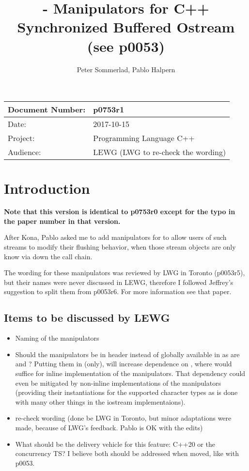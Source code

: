 \documentclass[ebook,11pt,article]{memoir}
\title{\papernumber{} - Manipulators for C++ Synchronized Buffered Ostream (see p0053)}
\author{Peter Sommerlad, Pablo Halpern}
\date{\paperdate}                %
\newcommand{\papernumber}{p0753r1}
\newcommand{\paperdate}{2017-10-15}
\begin{document}
\maketitle
\begin{center}
\begin{tabular}[t]{|l|l|}\hline 
Document Number:&  \papernumber \\\hline
Date: & \paperdate \\\hline
Project: & Programming Language C++\\\hline 
Audience: & LEWG (LWG to re-check the wording)\\\hline
\end{tabular}
\end{center}
\chapter{Introduction}
\textbf{Note that this version is identical to p0753r0 except for the typo in the paper number in that version.}


After Kona, Pablo asked me to add  manipulators for  to allow users of such streams to modify their flushing behavior, when those stream objects are only know via  down the call chain.

The wording for these manipulators was reviewed by LWG in Toronto (p0053r5), but their names were never discussed in LEWG, therefore I followed Jeffrey's suggestion to split them from p0053r6. For more information see that paper.


\section{Items to be discussed by LEWG}
\begin{itemize}
\item Naming of the manipulators
\item Should the manipulators be in header  instead of globally available in  as are  and ? Putting them in  (only), will increase dependence on , where  would suffice for inline implementation of the manipulators. That dependency could even be mitigated by non-inline implementations of the manipulators (providing their instantiations for the supported character types as is done with many other things in the iostream implementaions).
\item re-check wording (done be LWG in Toronto, but minor adaptations were made, because of LWG's feedback. Pablo is OK with the edits)
\item What should be the delivery vehicle for this feature: C++20 or the concurrency TS? I believe both should be addressed when moved, like with p0053.
\end{itemize}
\end{document}
